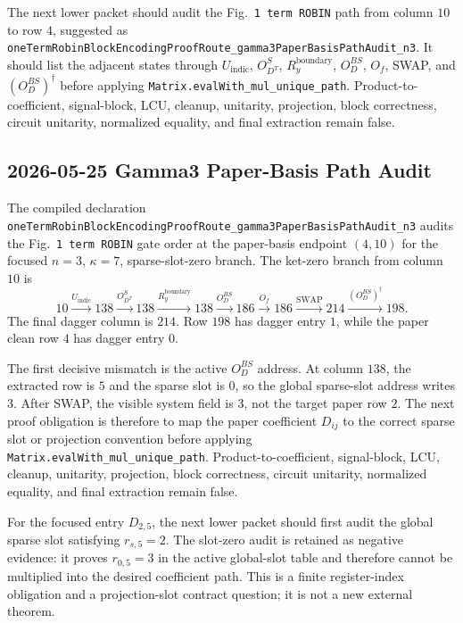 The next lower packet should audit the Fig.~\texttt{1 term ROBIN} path from
column \(10\) to row \(4\), suggested as
\texttt{oneTermRobinBlockEncodingProofRoute\_gamma3PaperBasisPathAudit\_n3}.
It should list the adjacent states through
\(U_{\mathrm{indic}}\), \(O_{D^T}^{S}\), \(R_y^{\mathrm{boundary}}\),
\(O_D^{BS}\), \(O_f\), SWAP, and \((O_D^{BS})^\dagger\) before applying
\texttt{Matrix.evalWith\_mul\_unique\_path}.  Product-to-coefficient,
signal-block, LCU, cleanup, unitarity, projection, block correctness, circuit
unitarity, normalized equality, and final extraction remain false.

\subsection{2026-05-25 Gamma3 Paper-Basis Path Audit}

The compiled declaration
\texttt{oneTermRobinBlockEncodingProofRoute\_gamma3PaperBasisPathAudit\_n3}
audits the Fig.~\texttt{1 term ROBIN} gate order at the paper-basis endpoint
\((4,10)\) for the focused \(n=3\), \(\kappa=7\), sparse-slot-zero branch.
The ket-zero branch from column \(10\) is
\[
10 \xrightarrow{U_{\mathrm{indic}}} 138
   \xrightarrow{O_{D^T}^{S}} 138
   \xrightarrow{R_y^{\mathrm{boundary}}} 138
   \xrightarrow{O_D^{BS}} 186
   \xrightarrow{O_f} 186
   \xrightarrow{\mathrm{SWAP}} 214
   \xrightarrow{(O_D^{BS})^\dagger} 198 .
\]
The final dagger column is \(214\).  Row \(198\) has dagger entry \(1\), while
the paper clean row \(4\) has dagger entry \(0\).

The first decisive mismatch is the active \(O_D^{BS}\) address.  At column
\(138\), the extracted row is \(5\) and the sparse slot is \(0\), so the
global sparse-slot address writes \(3\).  After SWAP, the visible system field
is \(3\), not the target paper row \(2\).  The next proof obligation is
therefore to map the paper coefficient \(D_{ij}\) to the correct sparse slot
or projection convention before applying
\texttt{Matrix.evalWith\_mul\_unique\_path}.  Product-to-coefficient,
signal-block, LCU, cleanup, unitarity, projection, block correctness, circuit
unitarity, normalized equality, and final extraction remain false.

For the focused entry \(D_{2,5}\), the next lower packet should first audit the
global sparse slot satisfying \(r_{s,5}=2\).  The slot-zero audit is retained as
negative evidence: it proves \(r_{0,5}=3\) in the active global-slot table and
therefore cannot be multiplied into the desired coefficient path.  This is a
finite register-index obligation and a projection-slot contract question; it
is not a new external theorem.

